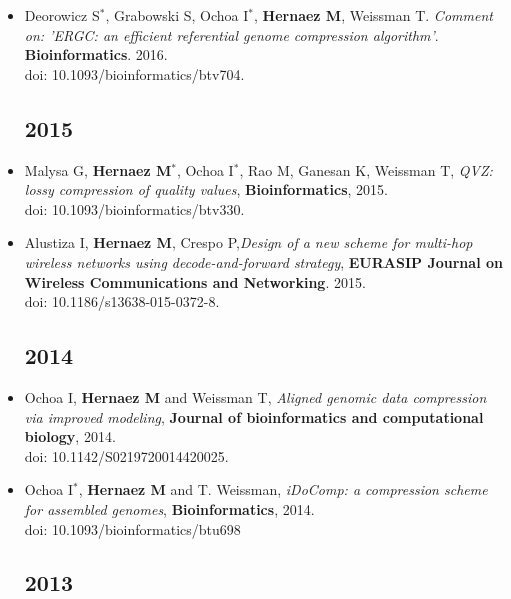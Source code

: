 \documentclass[11pt,a4paper,sans]{moderncv}        %
\begin{document}
\begin{itemize}
\item Deorowicz S$^\ast$, Grabowski S, Ochoa I$^\ast$, \textbf{Hernaez M}, Weissman T. \textsl{Comment on: 'ERGC: an efficient referential genome compression algorithm'}. \textbf{Bioinformatics}. 2016.\\
doi: 10.1093/bioinformatics/btv704.\\


\subsection{2015}
\vspace{6pt}

\item Malysa G, \textbf{Hernaez M}$^\ast$, Ochoa I$^\ast$, Rao M, Ganesan K, Weissman T, \textsl{ QVZ: lossy compression of quality values}, \textbf{Bioinformatics}, 2015.\\
doi: 10.1093/bioinformatics/btv330.\\

\item Alustiza I, \textbf{Hernaez M}, Crespo P,\textsl{Design of a new scheme for multi-hop wireless networks using decode-and-forward strategy}, \textbf{EURASIP Journal on Wireless Communications and Networking}. 2015.\\
doi: 10.1186/s13638-015-0372-8.\\

\subsection{2014}
\vspace{6pt}

\item Ochoa I, \textbf{Hernaez M} and Weissman T, \textsl{Aligned genomic data compression via improved modeling}, \textbf{Journal of bioinformatics and computational biology}, 2014.\\
 doi: 10.1142/S0219720014420025.\\

\item Ochoa I$^\ast$, \textbf{Hernaez M} and T. Weissman, \textsl{ iDoComp: a compression scheme for assembled genomes}, \textbf{Bioinformatics}, 2014.\\
doi: 10.1093/bioinformatics/btu698\\

\subsection{2013}
\vspace{6pt}


\end{itemize}
\end{document}
